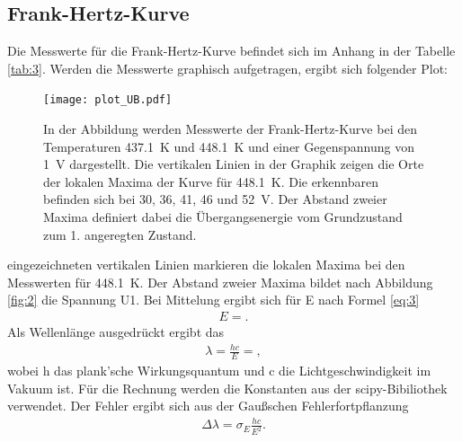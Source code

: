 \subsection{Frank-Hertz-Kurve}

Die Messwerte für die Frank-Hertz-Kurve befindet sich im Anhang in der Tabelle \ref{tab:3}.
Werden die Messwerte graphisch aufgetragen, ergibt sich folgender Plot:

\begin{figure}[H]
    \centering
    \texttt{[image: plot\_UB.pdf]}
    \caption{
        In der Abbildung werden Messwerte der
        Frank-Hertz-Kurve bei den Temperaturen \SI{437.1}{\kelvin} und \SI{448.1}{\kelvin} und einer Gegenspannung von \SI{1}{\volt} dargestellt.
        Die vertikalen Linien in der Graphik zeigen die Orte der lokalen Maxima der Kurve für \SI{448.1}{\kelvin}. Die erkennbaren
        befinden sich bei 30, 36, 41, 46 und \SI{52}{\volt}. Der Abstand zweier 
        Maxima definiert dabei die Übergangsenergie vom Grundzustand zum 1.
        angeregten Zustand.
    }
    \label{fig:7} 
\end{figure}
 eingezeichneten vertikalen Linien markieren die lokalen Maxima bei den
Messwerten für \SI{448.1}{\kelvin}. Der Abstand zweier Maxima bildet nach 
Abbildung \ref{fig:2} die Spannung U1. Bei Mittelung ergibt sich für E nach Formel \eqref{eq:3}
\begin{align}
    E = \text{}. \label{eq:7} 
\end{align}
Als Wellenlänge ausgedrückt ergibt das
\begin{align}
    \lambda = \frac{h c}{E} = \text{}  , \label{eq:8} 
\end{align}
wobei h das plank'sche Wirkungsquantum und c die Lichtgeschwindigkeit im Vakuum ist.
Für die Rechnung  werden die Konstanten aus der scipy-Bibiliothek  verwendet.
Der Fehler ergibt sich aus der Gaußschen Fehlerfortpflanzung
\begin{align}
    \Delta \lambda = \sigma _{E}  \frac{h c}{E^2}. \label{eq:9} 
\end{align}




